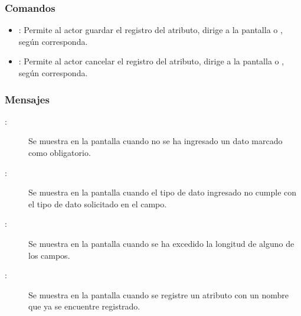 \subsubsection{Comandos}
\begin{itemize}
	\item {}: Permite al actor guardar el registro del atributo, dirige a la pantalla  o , según corresponda.
	\item {}: Permite al actor cancelar el registro del atributo, dirige a la pantalla  o , según corresponda.
\end{itemize}

\subsubsection{Mensajes}

	
\begin{description}
	\item[:] Se muestra en la pantalla  cuando no se ha ingresado un dato marcado como obligatorio.
	\item[:] Se muestra en la pantalla  cuando el tipo de dato ingresado no cumple con el tipo de dato solicitado en el campo.
	\item[:] Se muestra en la pantalla  cuando se ha excedido la longitud de alguno de los campos.
	\item[:] Se muestra en la pantalla  cuando se registre un atributo con un nombre que ya se encuentre registrado.
\end{description}
